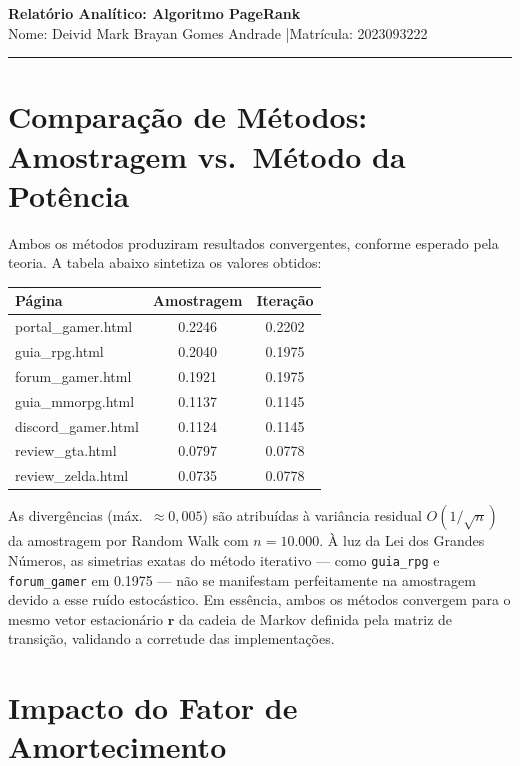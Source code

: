 \documentclass[11pt,a4paper]{article}
\begin{document}
\begin{center}
    {\large\bfseries Relatório Analítico: Algoritmo PageRank}\\[2pt]
    {\small Nome: Deivid Mark Brayan Gomes Andrade \quad|\quad Matrícula: 2023093222}
\end{center}

\vspace{3pt}
\hrule
\vspace{5pt}

\section{Comparação de Métodos: Amostragem vs.\ Método da Potência}

Ambos os métodos produziram resultados convergentes, conforme esperado pela teoria. A tabela abaixo sintetiza os valores obtidos:

\begin{center}
\small
{}
\begin{tabular}{lcc}
\toprule
\textbf{Página} & \textbf{Amostragem} & \textbf{Iteração} \\
\midrule
portal\_gamer.html  & 0.2246 & 0.2202 \\
guia\_rpg.html      & 0.2040 & 0.1975 \\
forum\_gamer.html   & 0.1921 & 0.1975 \\
guia\_mmorpg.html   & 0.1137 & 0.1145 \\
discord\_gamer.html & 0.1124 & 0.1145 \\
review\_gta.html    & 0.0797 & 0.0778 \\
review\_zelda.html  & 0.0735 & 0.0778 \\
\bottomrule
\end{tabular}
\end{center}

As divergências (máx.\ $\approx 0{,}005$) são atribuídas à variância residual $O(1/\sqrt{n})$ da amostragem por Random Walk com $n=10{.}000$. À luz da Lei dos Grandes Números, as simetrias exatas do método iterativo --- como \texttt{guia\_rpg} e \texttt{forum\_gamer} em 0.1975 --- não se manifestam perfeitamente na amostragem devido a esse ruído estocástico. Em essência, ambos os métodos convergem para o mesmo vetor estacionário $\mathbf{r}$ da cadeia de Markov definida pela matriz de transição, validando a corretude das implementações.

\section{Impacto do Fator de Amortecimento}
\end{document}
